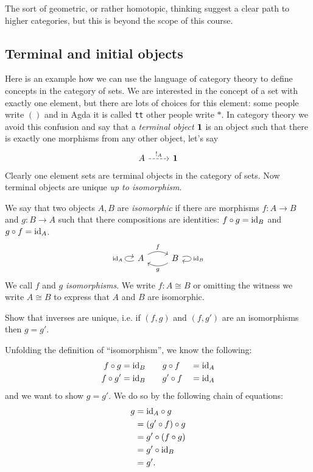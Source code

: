 The sort of geometric, or rather homotopic, thinking suggest a clear path to higher categories, but this is beyond the scope of this course.

\subsection{Terminal and initial objects}
\label{sec:term-init-objects}

Here is an example how we can use the language of category theory to define concepts in the category of sets. We are interested in the concept of a set with exactly one element, but there are lots of choices for this element: some people write $()$ and in Agda it is called \texttt{tt} other people write $*$. In category theory we avoid this confusion and say that a \emph{terminal object} $\bf{1}$ is an object such that there is exactly one morphisms from any other object, let's say 
\[\begin{tikzcd}
  A \arrow[r, dashrightarrow, "!_A"] & \bf{1}
\end{tikzcd}\]
Clearly one element sets are terminal objects in the category of sets. Now terminal objects are unique \emph{up to isomorphism}. 

We say that two objects $A,B$ are \emph{isomorphic} if there are morphisms $f : A \to B$ and $g : B \to A$ such that there compositions are identities: $f \circ g = \mathrm{id}_B$ and $g \circ f = \mathrm{id}_A$. 
\[\begin{tikzcd}
  A \arrow[r, bend left, "f"]  \arrow[loop left,"\id_A"] & B \arrow[l,bend left ,"g"]\arrow[loop right,"\id_B"] 
\end{tikzcd}\]
We call $f$ and $g$ \emph{isomorphisms}. We write $f : A \cong B$ or omitting the witness we write $A \cong B$ to express that $A$ and $B$ are isomorphic. 
\begin{Exercise}
  Show that inverses are unique, i.e. if $(f,g)$ and $(f,g')$ are an isomorphisms then $g = g'$. 
\end{Exercise}
\begin{Answer}
  Unfolding the definition of ``isomorphism'', we know the following:
  \begin{alignat*}{2}
    f\circ g &= \mathrm{id}_B \qquad g\circ f&&=\mathrm{id}_A\\
    f\circ g' &= \mathrm{id}_B \qquad g'\circ f&&=\mathrm{id}_A
  \end{alignat*}
  and we want to show $g=g'$. We do so by the following chain of equations:
  \begin{align*}
    g &= \mathrm{id}_A \circ g \\
      &= (g'\circ f) \circ g\\
      &= g' \circ (f\circ g)\\
      &= g' \circ \mathrm{id}_B\\
      &= g'.
  \end{align*}
\end{Answer}

